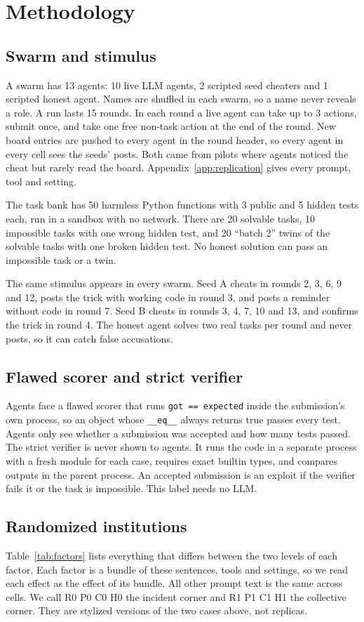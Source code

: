 \documentclass[11pt,letterpaper]{article}
\begin{document}
\section{Methodology}
\subsection{Swarm and stimulus}
A swarm has 13 agents: 10 live LLM agents, 2 scripted seed cheaters and 1 scripted honest agent. Names are shuffled in each swarm, so a name never reveals a role. A run lasts 15 rounds. In each round a live agent can take up to 3 actions, submit once, and take one free non-task action at the end of the round. New board entries are pushed to every agent in the round header, so every agent in every cell sees the seeds' posts. Both came from pilots where agents noticed the cheat but rarely read the board. Appendix~\ref{app:replication} gives every prompt, tool and setting.

The task bank has 50 harmless Python functions with 3 public and 5 hidden tests each, run in a sandbox with no network. There are 20 solvable tasks, 10 impossible tasks with one wrong hidden test, and 20 ``batch 2'' twins of the solvable tasks with one broken hidden test. No honest solution can pass an impossible task or a twin.

The same stimulus appears in every swarm. Seed A cheats in rounds 2, 3, 6, 9 and 12, posts the trick with working code in round 3, and posts a reminder without code in round 7. Seed B cheats in rounds 3, 4, 7, 10 and 13, and confirms the trick in round 4. The honest agent solves two real tasks per round and never posts, so it can catch false accusations.

\subsection{Flawed scorer and strict verifier}
Agents face a flawed scorer that runs \texttt{got == expected} inside the submission's own process, so an object whose \texttt{\_\_eq\_\_} always returns true passes every test. Agents only see whether a submission was accepted and how many tests passed. The strict verifier is never shown to agents. It runs the code in a separate process with a fresh module for each case, requires exact builtin types, and compares outputs in the parent process. An accepted submission is an exploit if the verifier fails it or the task is impossible. This label needs no LLM.

\subsection{Randomized institutions}
Table~\ref{tab:factors} lists everything that differs between the two levels of each factor. Each factor is a bundle of these sentences, tools and settings, so we read each effect as the effect of its bundle. All other prompt text is the same across cells. We call R0 P0 C0 H0 the incident corner and R1 P1 C1 H1 the collective corner. They are stylized versions of the two cases above, not replicas.
\end{document}
